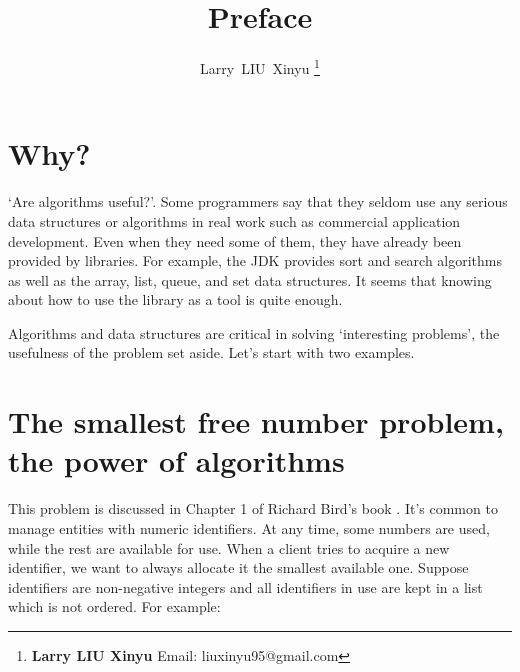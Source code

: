 \documentclass{article}
\begin{document}


\title{Preface}

\author{Larry~LIU~Xinyu
\thanks{{\bfseries Larry LIU Xinyu } \newline
  Email: liuxinyu95@gmail.com \newline}
  }

\maketitle
\fi


\section{Why?}
\label{why}

`Are algorithms useful?'. Some programmers
say that they seldom use any serious data structures or algorithms
in real work such as commercial application development. Even when they need
some of them, they have already been provided by libraries. For example,
the JDK provides sort and search algorithms as well as the array, list, queue, and set data structures.
It seems that knowing about how to use the library as a tool is quite
enough.

Algorithms and data structures are critical in solving `interesting
problems', the usefulness of the problem set aside. Let's start with two examples.

\section{The smallest free number problem, the power of algorithms}
\label{min-free} 

This problem is discussed in Chapter 1 of Richard Bird's book \cite{Bird-book}.
It's common to manage entities with numeric identifiers.
At any time, some numbers are used, while the rest are available for use.
When a client tries to acquire a new identifier, we want to always allocate
it the smallest available one. Suppose identifiers are non-negative integers
and all identifiers in use are kept in a list which is not ordered. For example:
\end{document}
